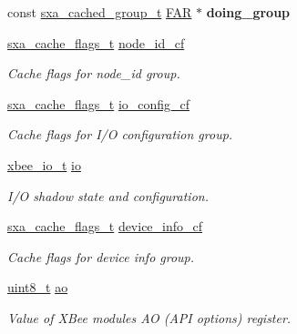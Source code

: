 \begin{DoxyCompactItemize}
const \hyperlink{structsxa__cached__group__t}{sxa\+\_\+cached\+\_\+group\+\_\+t} \hyperlink{group__hal_gaef060b3456fdcc093a7210a762d5f2ed}{F\+AR} $\ast$ {\bfseries doing\+\_\+group}
\item 
\mbox{\label{structsxa__node__t_ac2acdbe4009c4fc763c6ac93bc0056eb}} 
\hyperlink{group___s_x_a_ga21b45e50d83fcc1363c4239313e88c06}{sxa\+\_\+cache\+\_\+flags\+\_\+t} \hyperlink{structsxa__node__t_ac2acdbe4009c4fc763c6ac93bc0056eb}{node\+\_\+id\+\_\+cf}
\begin{DoxyCompactList}\small\item\em Cache flags for node\+\_\+id group. \end{DoxyCompactList}\item 
\mbox{\label{structsxa__node__t_a8b839f7ad17e883aa9ef2532b2be929a}} 
\hyperlink{group___s_x_a_ga21b45e50d83fcc1363c4239313e88c06}{sxa\+\_\+cache\+\_\+flags\+\_\+t} \hyperlink{structsxa__node__t_a8b839f7ad17e883aa9ef2532b2be929a}{io\+\_\+config\+\_\+cf}
\begin{DoxyCompactList}\small\item\em Cache flags for I/O configuration group. \end{DoxyCompactList}\item 
\hyperlink{structxbee__io__t}{xbee\+\_\+io\+\_\+t} \hyperlink{structsxa__node__t_a87711fd12194e90fe58291cf2ea6e30f}{io}
\begin{DoxyCompactList}\small\item\em I/O shadow state and configuration. \end{DoxyCompactList}\item 
\mbox{\label{structsxa__node__t_a02af329d146957380b2ca7ffaae5bd83}} 
\hyperlink{group___s_x_a_ga21b45e50d83fcc1363c4239313e88c06}{sxa\+\_\+cache\+\_\+flags\+\_\+t} \hyperlink{structsxa__node__t_a02af329d146957380b2ca7ffaae5bd83}{device\+\_\+info\+\_\+cf}
\begin{DoxyCompactList}\small\item\em Cache flags for device info group. \end{DoxyCompactList}\item 
\hyperlink{group__hal__dos_gae1affc9ca37cfb624959c866a73f83c2}{uint8\+\_\+t} \hyperlink{structsxa__node__t_a4f850621475e7b60aa5aee84dda81a8f}{ao}
\begin{DoxyCompactList}\small\item\em Value of X\+Bee module\textquotesingle{}s AO (A\+PI options) register. \end{DoxyCompactList}\item 

\end{DoxyCompactItemize}
